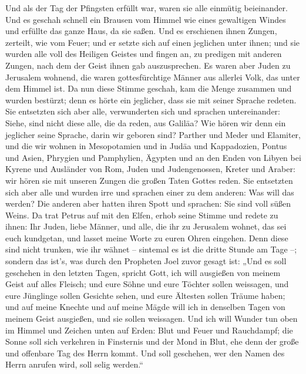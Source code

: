  Und als der Tag der Pfingsten erfüllt war, waren sie alle
einmütig beieinander.  Und es geschah schnell ein Brausen
vom Himmel wie eines gewaltigen Windes und erfüllte das ganze Haus, da
sie saßen.  Und es erschienen ihnen Zungen, zerteilt, wie
vom Feuer; und er setzte sich auf einen jeglichen unter ihnen;
 und sie wurden alle voll des Heiligen Geistes und fingen
an, zu predigen mit anderen Zungen, nach dem der Geist ihnen gab
auszusprechen.  Es waren aber Juden zu Jerusalem wohnend,
die waren gottesfürchtige Männer aus allerlei Volk, das unter dem Himmel
ist.  Da nun diese Stimme geschah, kam die Menge zusammen
und wurden bestürzt; denn es hörte ein jeglicher, dass sie mit seiner
Sprache redeten.  Sie entsetzten sich aber alle,
verwunderten sich und sprachen untereinander: Siehe, sind nicht diese
alle, die da reden, aus Galiläa?  Wie hören wir denn ein
jeglicher seine Sprache, darin wir geboren sind?  Parther
und Meder und Elamiter, und die wir wohnen in Mesopotamien und in Judäa
und Kappadozien, Pontus und Asien,  Phrygien und
Pamphylien, Ägypten und an den Enden von Libyen bei Kyrene und Ausländer
von Rom,  Juden und Judengenossen, Kreter und Araber: wir
hören sie mit unseren Zungen die großen Taten Gottes reden.
 Sie entsetzten sich aber alle und wurden irre und
sprachen einer zu dem anderen: Was will das werden?  Die
anderen aber hatten ihren Spott und sprachen: Sie sind voll süßen Weins.
 Da trat Petrus auf mit den Elfen, erhob seine Stimme und
redete zu ihnen: Ihr Juden, liebe Männer, und alle, die ihr zu Jerusalem
wohnet, das sei euch kundgetan, und lasset meine Worte zu euren Ohren
eingehen.  Denn diese sind nicht trunken, wie ihr wähnet
-- sintemal es ist die dritte Stunde am Tage --;  sondern
das ist's, was durch den Propheten Joel zuvor gesagt ist:
 „Und es soll geschehen in den letzten Tagen, spricht
Gott, ich will ausgießen von meinem Geist auf alles Fleisch; und eure
Söhne und eure Töchter sollen weissagen, und eure Jünglinge sollen
Gesichte sehen, und eure Ältesten sollen Träume haben; 
und auf meine Knechte und auf meine Mägde will ich in denselben Tagen
von meinem Geist ausgießen, und sie sollen weissagen. 
Und ich will Wunder tun oben im Himmel und Zeichen unten auf Erden: Blut
und Feuer und Rauchdampf;  die Sonne soll sich verkehren
in Finsternis und der Mond in Blut, ehe denn der große und offenbare Tag
des Herrn kommt.  Und soll geschehen, wer den Namen des
Herrn anrufen wird, soll selig werden.``

